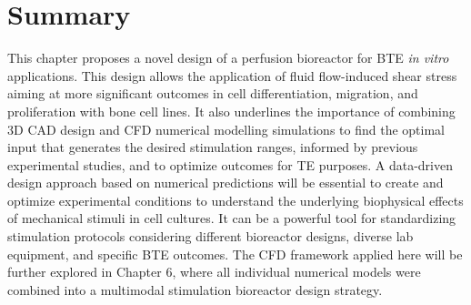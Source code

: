\section{Summary}
This chapter proposes a novel design of a perfusion bioreactor for \ac{BTE} \textit{in vitro} applications. This design allows the application of fluid flow-induced shear stress aiming at more significant outcomes in cell differentiation, migration, and proliferation with bone cell lines. It also underlines the importance of combining \ac{3D} \ac{CAD} design and \ac{CFD} numerical modelling simulations to find the optimal input that generates the desired stimulation ranges, informed by previous experimental studies, and to optimize outcomes for \ac{TE} purposes. A data-driven design approach based on numerical predictions will be essential to create and optimize experimental conditions to understand the underlying biophysical effects of mechanical stimuli in cell cultures. It can be a powerful tool for standardizing stimulation protocols considering different bioreactor designs, diverse lab equipment, and specific BTE outcomes. The CFD framework applied here will be further explored in Chapter 6, where all individual numerical models were combined into a multimodal stimulation bioreactor design strategy.  


% 
%
%